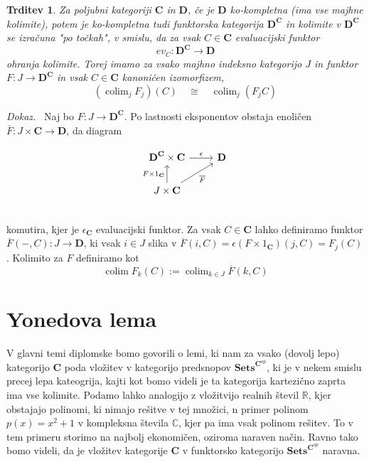 \documentclass[12pt,a4paper]{book}
\theoremstyle{definition}
\theoremstyle{plain}
\newtheorem{trditev}[definicija]{Trditev}
\newenvironment{dokaz}{\emph{Dokaz.}\ }{\hspace{\fill}{$\Box$}}
\theoremstyle{definition}
\theoremstyle{remark}
\newcommand{\cat}[1]{\textbf{#1}}
\DeclareMathOperator{\colim}{colim}
\newcommand{\predsnop}[1]{\cat{Sets}^{\cat{#1}^{op}}}
\begin{document}
\begin{trditev}
\label{ohranjanje kolimit}
Za poljubni kategoriji $\cat{C}$ in $\cat{D}$, če je $\cat{D}$ ko-kompletna (ima vse majhne kolimite), potem je ko-kompletna tudi funktorska kategorija $\cat{D}^{\cat{C}}$ in kolimite v $\cat{D}^{\cat{C}}$ se izračuna "po točkah", v smislu, da za vsak $C \in \cat{C}$ evaluacijski funktor
$$ev_C : \cat{D}^{\cat{C}} \to \cat{D}$$
ohranja kolimite. Torej imamo za vsako majhno indeksno kategorijo $J$ in funktor $F : J \to \cat{D}^{\cat{C}}$ in vsak $C \in \cat{C}$ kanoničen izomorfizem,
$$(\colim_j F_j)(C) \quad \cong \quad \colim_j (F_jC)$$
\end{trditev}
\begin{dokaz}
Naj bo $F: J \to \cat{D}^{\cat{C}}$. Po lastnosti eksponentov obstaja enoličen $\overline{F}: J \times \cat{C} \to \cat{D}$, da diagram

\begin{equation}
\begin{tikzcd}
\cat{D}^{\cat{C}} \times \cat{C} \ar[r, "\epsilon"] & \cat{D} \\
J \times \cat{C} \ar[u, "F \times 1_{\cat{C}}"] \ar[ur, "\overline{F}"'] \\
\end{tikzcd}
\end{equation}
komutira, kjer je $\epsilon_{\cat{C}}$ evaluacijski funktor.
Za vsak $C \in \cat{C}$ lahko definiramo funktor $\overline{F}(-,C): J \to \cat{D}$, ki vsak $i \in J$ slika v $\overline{F}(i,C) = \epsilon(F \times 1_\cat{C})(j,C) = F_j(C)$.
Kolimito za $F$ definiramo kot
$$\colim F_k(C) := \colim_{k \in J}\overline{F}(k,C)$$
\end{dokaz}


\chapter{Yonedova lema}

V glavni temi diplomske bomo govorili o lemi, ki nam za vsako (dovolj lepo) kategorijo $\cat{C}$ poda vložitev v kategorijo predsnopov $\predsnop{C}$, ki je v nekem smislu precej lepa kateogrija, kajti kot bomo videli je ta kategorija kartezično zaprta ima vse kolimite.
Podamo lahko analogijo z vložitvijo realnih števil $\mathbb{R}$, kjer obstajajo polinomi, ki nimajo rešitve v tej množici, n primer polinom $p(x) = x^2 + 1$ v kompleksna števila $\mathbb{C}$, kjer pa ima vsak polinom rešitev. To v tem primeru storimo na najbolj ekonomičen, oziroma naraven način. Ravno tako bomo videli, da je vložitev kategorije $\cat{C}$ v funktorsko kategorijo $\predsnop{C}$ naravna.
\end{document}
